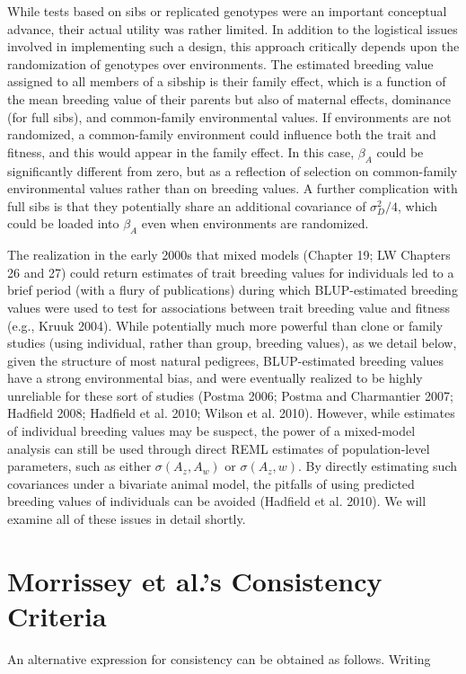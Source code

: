 \documentclass{article}
\begin{document}
While tests based on sibs or replicated genotypes were an important conceptual advance, their actual utility was rather limited. In addition to the logistical issues involved in implementing such a design, this approach critically depends upon the randomization of genotypes over environments. The estimated breeding value assigned to all members of a sibship is their family effect, which is a function of the mean breeding value of their parents but also of maternal effects, dominance (for full sibs), and common-family environmental values. If environments are not randomized, a common-family environment could influence both the trait and fitness, and this would appear in the family effect. In this case,  $ \beta_{A} $ could be significantly different from zero, but as a reflection of selection on common-family environmental values rather than on breeding values. A further complication with full sibs is that they potentially share an additional covariance of  $ \sigma_{D}^{2}/4 $, which could be loaded into  $ \beta_{A} $ even when environments are randomized.

The realization in the early 2000s that mixed models (Chapter 19; LW Chapters 26 and 27) could return estimates of trait breeding values for individuals led to a brief period (with a flury of publications) during which BLUP-estimated breeding values were used to test for associations between trait breeding value and fitness (e.g., Kruuk 2004). While potentially much more powerful than clone or family studies (using individual, rather than group, breeding values), as we detail below, given the structure of most natural pedigrees, BLUP-estimated breeding values have a strong environmental bias, and were eventually realized to be highly unreliable for these sort of studies (Postma 2006; Postma and Charmantier 2007; Hadfield 2008; Hadfield et al. 2010; Wilson et al. 2010). However, while estimates of individual breeding values may be suspect, the power of a mixed-model analysis can still be used through direct REML estimates of population-level parameters, such as either  $ \sigma(A_z, A_w) $ or  $ \sigma(A_z, w) $. By directly estimating such covariances under a bivariate animal model, the pitfalls of using predicted breeding values of individuals can be avoided (Hadfield et al. 2010). We will examine all of these issues in detail shortly.

\section{Morrissey et al.'s Consistency Criteria}
An alternative expression for consistency can be obtained as follows. Writing
\end{document}
